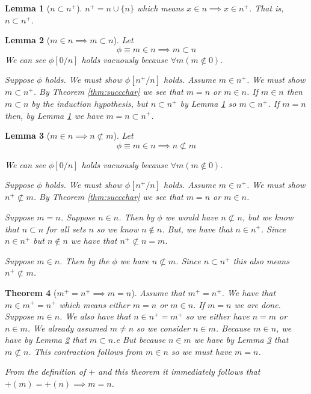 \documentclass[12pt]{article}
\theoremstyle{break}
\theoremstyle{break}
\newtheorem{theorem}{Theorem}[section]
\theoremstyle{break}
\theoremstyle{break}
\newtheorem{lemma}[theorem]{Lemma}
\theoremstyle{break}
\newtheorem{informal definition}[definition]{Informal Definition}
\begin{document}
\begin{lemma}[$n \subset n^+$]
\label{lem:nsubsetnplus}
$n^+ = n \cup \{n\}$ which means $x\in n \implies x \in n^+$.
That is, $n \subset n^+$.
\end{lemma}

\begin{lemma}[$m\in n \implies m \subset n$]
\label{lem:minnmsubsetn}
Let
$$
\phi \equiv m\in n \implies m \subset n
$$
We can see $\phi[0/n]$ holds vacuously because $\forall m (m\not \in 0)$.

Suppose $\phi$ holds.
We must show $\phi[n^+/n]$ holds.
Assume $m\in n^+$.
We must show $m\subset n^+$.
By Theorem \ref{thm:succchar} we see that $m = n$ or $m\in n$.
If $m\in n$ then $m\subset n$ by the induction hypothesis, but $n \subset n^+$ by Lemma \ref{lem:nsubsetnplus} so $m\subset n^+$.
If $m=n$ then, by Lemma \ref{lem:nsubsetnplus} we have $m=n \subset n^+$.
\end{lemma}

\begin{lemma}[$m\in n \implies n \not \subset m$]
\label{lem:minnnnotsubsetm}
Let
$$
\phi \equiv m\in n \implies n \not \subset m
$$

We can see $\phi[0/n]$ holds vacuously because $\forall m (m \not \in 0)$.

Suppose $\phi$ holds. We must show $\phi[n^+/n]$ holds.
Assume $m\in n^+$.
We must show $n^+ \not \subset m$.
By Theorem \ref{thm:succchar} we see that $m=n$ or $m\in n$.

Suppose $m=n$.
Suppose $n\in n$.
Then by $\phi$ we would have $n\not \subset n$, but we know that $n\subset n$ for all sets $n$ so we know $n\not \in n$.
But, we have that $n\in n^+$.
Since $n\in n^+$ but $n\not \in n$ we have that $n^+ \not \subset n = m$.

Suppose $m\in n$.
Then by the $\phi$ we have $n \not \subset m$.
Since $n\subset n^+$ this also means $n^+\not \subset m$.
\end{lemma}

\begin{theorem}[$m^+ = n^+ \implies m=n$]
Assume that $m^+ = n^+$.
We have that $m\in m^+=n^+$ which means either $m=n$ or $m\in n$.
If $m=n$ we are done.
Suppose $m\in n$.
We also have that $n \in n^+ = m^+$ so we either have $n=m$ or $n\in m$.
We already assumed $m\not = n$ so we consider $n\in m$.
Because $m\in n$, we have by Lemma \ref{lem:minnmsubsetn} that $m\subset n$.e
But because $n\in m$ we have by Lemma \ref{lem:minnnnotsubsetm} that $m\not \subset n$.
This contraction follows from $m\in n$ so we must have $m=n$.

From the definition of $+$ and this theorem it immediately follows that $+(m)=+(n) \implies m=n$.
\end{theorem}
\end{document}
